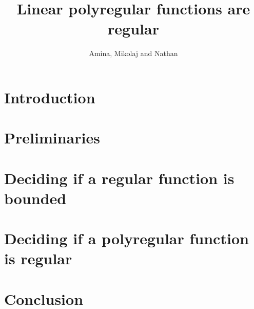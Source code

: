 \documentclass{article}
\begin{document}
 \title{Linear polyregular functions are regular}
 \author{Amina, Mikolaj and Nathan}
 \maketitle



\section{Introduction}

\section{Preliminaries}

\section{Deciding if a regular function is bounded}

\section{Deciding if a polyregular function is regular}

\section{Conclusion}




\end{document}
